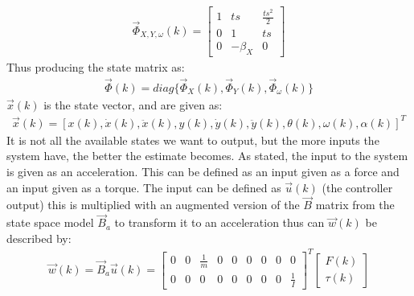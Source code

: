 \begin{align}
\vec{\Phi}_{X,Y,\omega}(k) = \begin{bmatrix}
1 & ts & \frac{ts^2}{2}\\
0 & 1 & ts\\
0 & -\beta _{X} & 0
\end{bmatrix}
\end{align}
Thus producing the state matrix as:
\begin{align}
\vec{\Phi}(k) = diag\{\vec{\Phi}_{X}(k),\vec{\Phi}_{Y}(k),\vec{\Phi}_{\omega}(k)\} 
\end{align}
$\vec{x}(k)$ is the state vector, and are given as:
\begin{align}
\vec{x}(k) = [x(k),\dot{x}(k),\ddot{x}(k),y(k),\dot{y}(k),\ddot{y}(k),\theta(k),\omega(k),\alpha(k)]^T
\end{align}
It is not all the available states we want to output, but the more inputs the system have, the better the estimate becomes. As stated, the input to the system is given as an acceleration. This can be defined as an input given as a force and an input given as a torque. The input can be defined as $\vec{u}(k)$ (the controller output) this is multiplied with an augmented version of the $\vec{B}$ matrix from the state space model $\vec{B}_a$ to transform it to an acceleration thus can $\vec{w}(k)$ be described by:
\begin{align}
\vec{w}(k) = \vec{B}_a\vec{u}(k) = \begin{bmatrix}
0 & 0 & \frac{1}{m} & 0 & 0 & 0 & 0 & 0 & 0\\
0 & 0 & 0 & 0 & 0 & 0 & 0 & 0 & \frac{1}{I}
\end{bmatrix}^T\begin{bmatrix}
F(k)\\
\tau(k)
\end{bmatrix}
\end{align}

